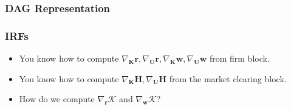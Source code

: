 \documentclass[english,xcolor=svgnames]{beamer}
\begin{document}
\begin{frame}
    \frametitle{DAG Representation}
    
\end{frame}

\begin{frame}
    \frametitle{IRFs}
    \begin{itemize}
        \item You know how to compute $\nabla_{\mathbf{K}}\pmb{\mathbf{r}}, \nabla_{\mathbf{U}}\pmb{\mathbf{r}}, \nabla_{\bm{K}}\pmb{\mathbf{w}}, \nabla_{\bm{U}}\pmb{\mathbf{w}}$ from firm block.
        \item You know how to compute $\nabla_{\mathbf{K}}\pmb{\mathbf{H}}, \nabla_{\mathbf{U}}\pmb{\mathbf{H}}$ from the market clearing block.
        \item How do we compute $\nabla_{\mathbf{r}}\mathcal{K}$ and $\nabla_{\mathbf{w}}\mathcal{K}$?
	\end{itemize}
\end{frame}

\end{document}
